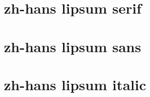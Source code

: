 \documentclass[a4paper,12pt, fontset=none, hyperref]{ctexbook}
\begin{document}
		\textit{\zhlipsum[1-20][name=nanshanjing]}

	\chapter{zh-hans lipsum serif}

		\zhlipsum[1-20]
		
	\chapter{zh-hans lipsum sans}

		\textbf{\zhlipsum[1-20]}

	\chapter{zh-hans lipsum italic}

		\textit{\zhlipsum[1-20]}
\end{document}
